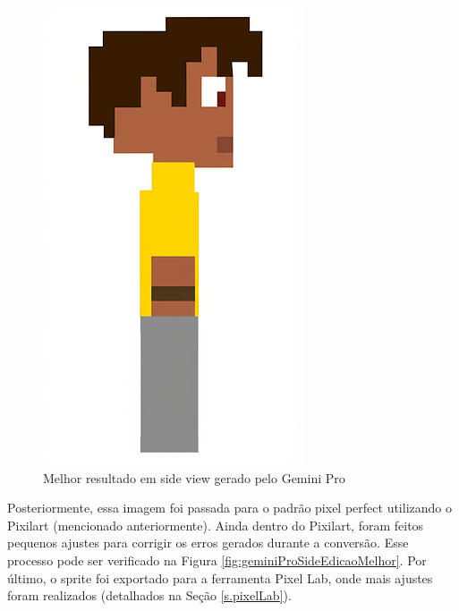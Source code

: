 \begin{figure}[htbp]
    \centering
    \caption{\small Melhor resultado em side view gerado pelo Gemini Pro}
    \label{fig:GeminiProSideMelhor}
    \includegraphics[width=0.3\linewidth]{figs/geminiPro/chat6/tela3_res1.png}
\end{figure}

Posteriormente, essa imagem foi passada para o padrão pixel perfect utilizando o Pixilart (mencionado anteriormente). Ainda dentro do Pixilart, foram feitos pequenos ajustes para corrigir os erros gerados durante a conversão. Esse processo pode ser verificado na Figura \ref{fig:geminiProSideEdicaoMelhor}. Por último, o sprite foi exportado para a ferramenta Pixel Lab, onde mais ajustes foram realizados (detalhados na Seção \ref{s.pixelLab}).

